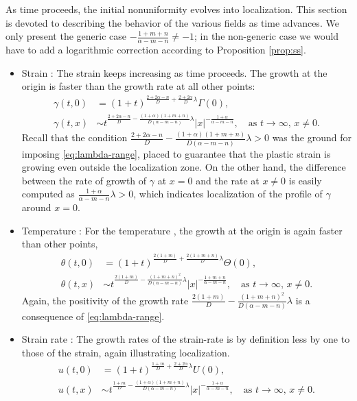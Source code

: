 \documentclass[usletter,11pt]{article}
\theoremstyle{remark}
\begin{document}
As time proceeds, the initial nonuniformity evolves into localization. This section is devoted to describing the behavior
of the various fields as time advances. We only present the generic case $-\frac{1+m+n}{\alpha-m-n}\ne-1$; 
in the non-generic case we would have to add a logarithmic correction according to Proposition \ref{prop:ss}.
\begin{itemize}
 \item Strain : The strain keeps increasing as time proceeds. The growth at the origin is faster than the growth rate at  all other points:
\begin{align*}
 \gamma(t,0) &= (1+t)^{\frac{2+2\alpha-n}{D} + \frac{2+2\alpha}{D}\lambda}\Gamma(0), 
 \\
 \gamma(t,x) &\sim t^{\frac{2+2\alpha-n}{D} - \frac{(1+\alpha)(1+m+n)}{D(\alpha-m-n)}\lambda}|x|^{-\frac{1+\alpha}{\alpha-m-n}}, \quad \text{as $t \rightarrow \infty$, $x\ne0$.}
\end{align*}
Recall that the condition  $\frac{2+2\alpha-n}{D} - \frac{(1+\alpha)(1+m+n)}{D(\alpha-m-n)}\lambda > 0$ was the ground for imposing \eqref{eq:lambda-range},
placed to guarantee that the plastic strain is growing even outside the localization zone. On the other hand, the difference between the rate of growth of $\gamma$ at $x=0$
and the rate at $x \ne 0$ is easily computed as $\frac{1+\alpha}{\alpha - m -n} \lambda > 0$, which indicates localization of the profile of $\gamma$ around $x=0$.
\item Temperature : For the  temperature , the growth at the origin is again faster than other points,
\begin{align*}
 \theta(t,0) &= (1+t)^{\frac{2(1+m)}{D} + \frac{2(1+m+n)}{D}\lambda}\Theta(0),
 \\
 \theta(t,x) &\sim t^{\frac{2(1+m)}{D} - \frac{(1+m+n)^2}{D(\alpha-m-n)}\lambda}|x|^{-\frac{1+m+n}{\alpha-m-n}}, \quad \text{as $t \rightarrow \infty$, $x\ne0$.}
\end{align*}
Again, the positivity of the growth rate $\frac{2(1+m)}{D} - \frac{(1+m+n)^2}{D(\alpha-m-n)}\lambda$ is a consequence of \eqref{eq:lambda-range}.
\item Strain rate : The growth rates of the strain-rate is by definition less by one to those of the strain, again illustrating localization.
\begin{align*}
 u(t,0) &= (1+t)^{\frac{1+m}{D} + \frac{2+2\alpha}{D}\lambda}U(0),
 \\
 u(t,x) &\sim t^{\frac{1+m}{D} - \frac{(1+\alpha)(1+m+n)}{D(\alpha-m-n)}\lambda}|x|^{-\frac{1+\alpha}{\alpha-m-n}}, \quad \text{as $t \rightarrow \infty$, $x\ne0$.}

\end{align*}
\end{itemize}
\end{document}
